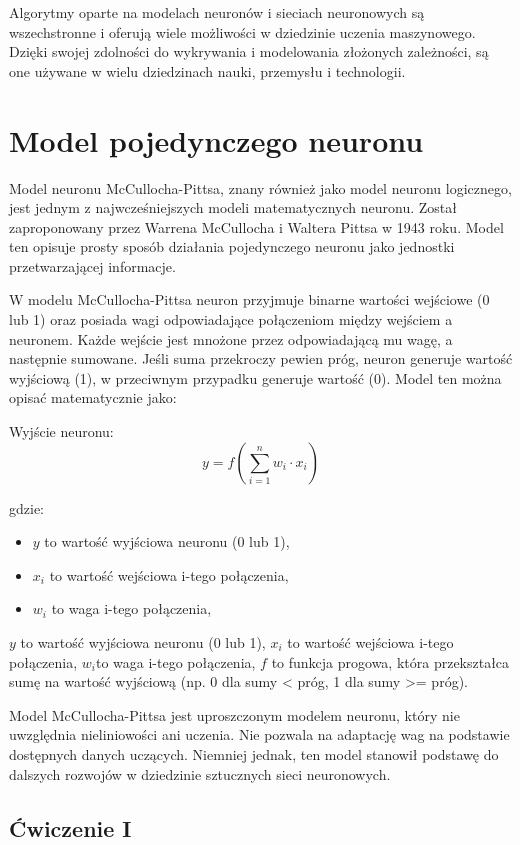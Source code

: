 \documentclass[12pt,twoside]{article}
\begin{document}
Algorytmy oparte na modelach neuronów i sieciach neuronowych są wszechstronne i oferują wiele możliwości w dziedzinie uczenia maszynowego. Dzięki swojej zdolności do wykrywania i modelowania złożonych zależności, są one używane w wielu dziedzinach nauki, przemysłu i technologii.

\clearpage

\section{Model pojedynczego neuronu}

Model neuronu McCullocha-Pittsa, znany również jako model neuronu logicznego, jest jednym z najwcześniejszych modeli matematycznych neuronu. Został zaproponowany przez Warrena McCullocha i Waltera Pittsa w 1943 roku. Model ten opisuje prosty sposób działania pojedynczego neuronu jako jednostki przetwarzającej informacje.

W modelu McCullocha-Pittsa neuron przyjmuje binarne wartości wejściowe (0 lub 1) oraz posiada wagi odpowiadające połączeniom między wejściem a neuronem. Każde wejście jest mnożone przez odpowiadającą mu wagę, a następnie sumowane. Jeśli suma przekroczy pewien próg, neuron generuje wartość wyjściową (1), w przeciwnym przypadku generuje wartość (0). Model ten można opisać matematycznie jako:

Wyjście neuronu:
$$y = f(\sum_{i=1}^{n} w_i \cdot x_i)$$

gdzie:
\begin{itemize}
	\item $y$ to wartość wyjściowa neuronu (0 lub 1),
	      \item$x_i$ to wartość wejściowa i-tego połączenia,
	      \item$w_i $ to waga i-tego połączenia,
\end{itemize}
$y$ to wartość wyjściowa neuronu (0 lub 1),
$x_i$ to wartość wejściowa i-tego połączenia,
$w_i $to waga i-tego połączenia,
$f$ to funkcja progowa, która przekształca sumę na wartość wyjściową (np. 0 dla sumy < próg, 1 dla sumy >= próg).

Model McCullocha-Pittsa jest uproszczonym modelem neuronu, który nie uwzględnia nieliniowości ani uczenia. Nie pozwala na adaptację wag na podstawie dostępnych danych uczących. Niemniej jednak, ten model stanowił podstawę do dalszych rozwojów w dziedzinie sztucznych sieci neuronowych.

\subsection{Ćwiczenie I}
\end{document}
